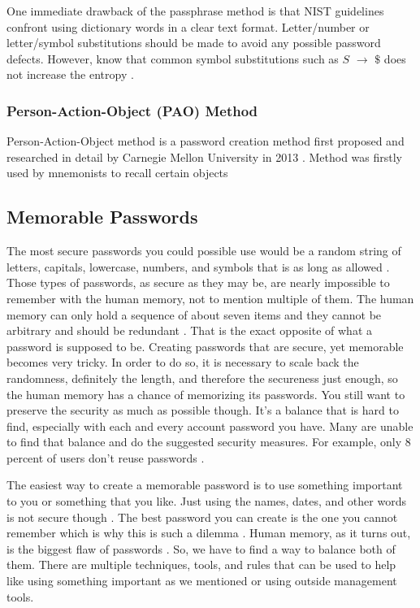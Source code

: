 \documentclass[acmsmall,nonacm]{acmart}
\begin{document}
One immediate drawback of the passphrase method is that NIST guidelines confront using dictionary words in a clear text format. Letter/number or letter/symbol substitutions should be made to avoid any possible password defects. However, know that common symbol substitutions such as $S$ ${\displaystyle \rightarrow }$ $\$$ does not increase the entropy \cite{ur_2015}.


\subsubsection{\textbf{Person-Action-Object (PAO) Method}} \label{creation-pao}

Person-Action-Object method is a password creation method first proposed and researched in detail by Carnegie Mellon University in 2013 \cite{blocki_2013}. Method was firstly used by mnemonists to recall certain objects

\subsection{Memorable Passwords}  \label{memorable}


The most secure passwords you could possible use would be a random string of letters, capitals, lowercase, numbers, and symbols that is as long as allowed \cite{lee_2014,nist_2020}. Those types of passwords, as secure as they may be, are nearly impossible to remember with the human memory, not to mention multiple of them. The human memory can only hold a sequence of about seven items and they cannot be arbitrary and should be redundant \cite{yan_2000}. That is the exact opposite of what a password is supposed to be. Creating passwords that are secure, yet memorable becomes very tricky. In order to do so, it is necessary to scale back the randomness, definitely the length, and therefore the secureness just enough, so the human memory has a chance of memorizing its passwords. You still want to preserve the security as much as possible though. It’s a balance that is hard to find, especially with each and every account password you have. Many are unable to find that balance and do the suggested security measures. For example, only 8 percent of users don’t reuse passwords \cite{lee_2014}.


The easiest way to create a memorable password is to use something important to you or something that you like. Just using the names, dates, and other words is not secure though \cite{rubenking_2021}. The best password you can create is the one you cannot remember which is why this is such a dilemma \cite{lee_2014}. Human memory, as it turns out, is the biggest flaw of passwords \cite{yan_2000}. So, we have to find a way to balance both of them. There are multiple techniques, tools, and rules that can be used to help like using something important as we mentioned or using outside management tools.
\end{document}
